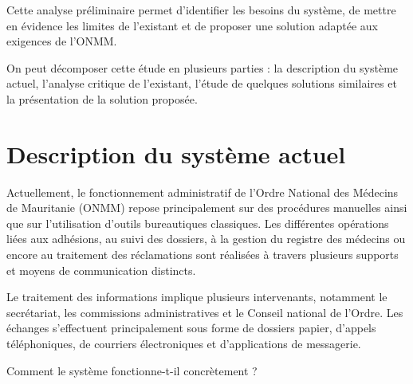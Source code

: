﻿\documentclass[12pt,a4paper]{report}
\begin{document}
Cette analyse préliminaire permet d'identifier les besoins du système,
de mettre en évidence les limites de l'existant et de proposer une
solution adaptée aux exigences de
l'ONMM.

On peut décomposer cette étude en plusieurs parties : la description du
système actuel, l'analyse critique de l'existant, l'étude de quelques
solutions similaires et la présentation de la solution proposée.
\section{Description du système actuel}

Actuellement, le fonctionnement administratif de l’Ordre National des
Médecins de Mauritanie (ONMM) repose principalement sur des procédures
manuelles ainsi que sur l’utilisation d’outils bureautiques classiques.
Les différentes opérations liées aux adhésions, au suivi des dossiers,
à la gestion du registre des médecins ou encore au traitement des
réclamations sont réalisées à travers plusieurs supports et moyens de
communication distincts.

Le traitement des informations implique plusieurs intervenants,
notamment le secrétariat, les commissions administratives et le Conseil
national de l’Ordre. Les échanges s’effectuent principalement sous
forme de dossiers papier, d’appels téléphoniques, de courriers
électroniques et d’applications de messagerie.

Comment le système fonctionne-t-il concrètement ?
\end{document}
